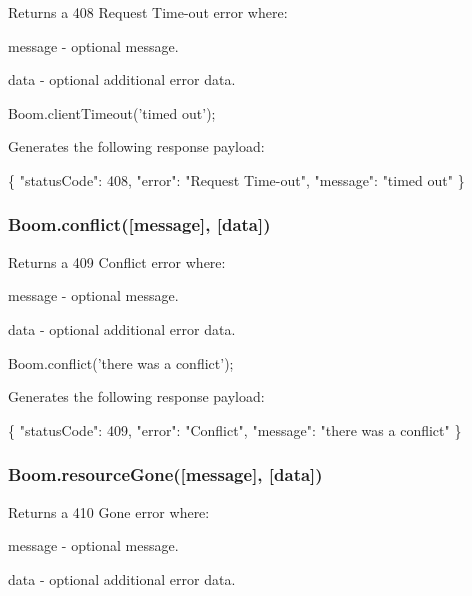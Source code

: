 Returns a 408 Request Time-\/out error where\+:
\begin{DoxyItemize}
\item {\ttfamily message} -\/ optional message.
\item {\ttfamily data} -\/ optional additional error data.
\end{DoxyItemize}


\begin{DoxyCode}
Boom.clientTimeout('timed out');
\end{DoxyCode}


Generates the following response payload\+:


\begin{DoxyCode}
\{
    "statusCode": 408,
    "error": "Request Time-out",
    "message": "timed out"
\}
\end{DoxyCode}


\subsubsection*{{\ttfamily Boom.\+conflict(\mbox{[}message\mbox{]}, \mbox{[}data\mbox{]})}}

Returns a 409 Conflict error where\+:
\begin{DoxyItemize}
\item {\ttfamily message} -\/ optional message.
\item {\ttfamily data} -\/ optional additional error data.
\end{DoxyItemize}


\begin{DoxyCode}
Boom.conflict('there was a conflict');
\end{DoxyCode}


Generates the following response payload\+:


\begin{DoxyCode}
\{
    "statusCode": 409,
    "error": "Conflict",
    "message": "there was a conflict"
\}
\end{DoxyCode}


\subsubsection*{{\ttfamily Boom.\+resource\+Gone(\mbox{[}message\mbox{]}, \mbox{[}data\mbox{]})}}

Returns a 410 Gone error where\+:
\begin{DoxyItemize}
\item {\ttfamily message} -\/ optional message.
\item {\ttfamily data} -\/ optional additional error data.
\end{DoxyItemize}


